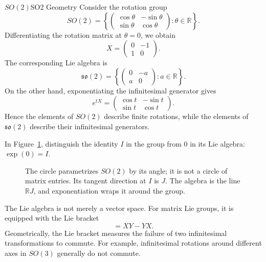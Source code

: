 \documentclass[../main.tex]{subfiles}
\begin{document}
\begin{example}{$SO(2)$}{SO2 Geometry}
  Consider the rotation group
  \begin{equation}
    SO(2)=\left\{
      \begin{pmatrix}
        \cos\theta & -\sin\theta\\
        \sin\theta & \cos\theta
      \end{pmatrix}
      :\theta\in\mathbb{R}
    \right\}.
  \end{equation}
  Differentiating the rotation matrix at $\theta=0$, we obtain
  \begin{equation}
    X=\begin{pmatrix}
      0 & -1\\
      1 & 0
    \end{pmatrix}.
  \end{equation}
  The corresponding Lie algebra is
  \begin{equation}
    \mathfrak{so}(2)=\left\{
      \begin{pmatrix}
        0 & -a\\
        a & 0
      \end{pmatrix}
      :a\in\mathbb{R}
    \right\}.
  \end{equation}
  On the other hand, exponentiating the infinitesimal generator gives
  \begin{equation}
    e^{tX}=
    \begin{pmatrix}
      \cos t & -\sin t\\
      \sin t & \cos t
    \end{pmatrix}.
  \end{equation}
  Hence the elements of $SO(2)$ describe finite rotations, while the elements of $\mathfrak{so}(2)$ describe their infinitesimal generators.
\end{example}


In Figure~\ref{fig:rotations-and-tangent-line}, distinguish the identity $I$ in the group from $0$ in its Lie algebra: $\exp(0)=I$.

\begin{figure}[H]
    \centering
    \caption{The circle parametrizes $SO(2)$ by its angle; it is not a circle of matrix entries. Its tangent direction at $I$ is $J$. The algebra is the line $\mathbb RJ$, and exponentiation wraps it around the group.}
    \label{fig:rotations-and-tangent-line}
\end{figure}

The Lie algebra is not merely a vector space. For matrix Lie groups, it is equipped with the Lie bracket
\begin{equation}
  [X,Y]=XY-YX.
\end{equation}
Geometrically, the Lie bracket measures the failure of two infinitesimal transformations to commute. For example, infinitesimal rotations around different axes in $SO(3)$ generally do not commute.
\end{document}
